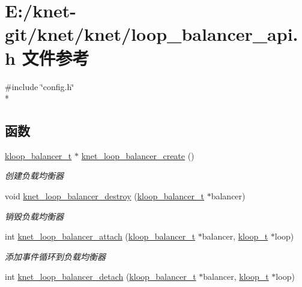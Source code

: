 \hypertarget{a00076}{}\section{E\+:/knet-\/git/knet/knet/loop\+\_\+balancer\+\_\+api.h 文件参考}
\label{a00076}
{\ttfamily \#include \char`\"{}config.\+h\char`\"{}}\\*
\subsection*{函数}
\begin{DoxyCompactItemize}
\item 
\hyperlink{a00053_abd3f964265beb2f8984e76f44fb5ea33_abd3f964265beb2f8984e76f44fb5ea33}{kloop\+\_\+balancer\+\_\+t} $\ast$ \hyperlink{a00109_ga4211b2d32e1a7447e479b9727dce61d4_ga4211b2d32e1a7447e479b9727dce61d4}{knet\+\_\+loop\+\_\+balancer\+\_\+create} ()
\begin{DoxyCompactList}\small\item\em 创建负载均衡器 \end{DoxyCompactList}\item 
void \hyperlink{a00109_ga6fcdd378027b0705cd2e279601985609_ga6fcdd378027b0705cd2e279601985609}{knet\+\_\+loop\+\_\+balancer\+\_\+destroy} (\hyperlink{a00053_abd3f964265beb2f8984e76f44fb5ea33_abd3f964265beb2f8984e76f44fb5ea33}{kloop\+\_\+balancer\+\_\+t} $\ast$balancer)
\begin{DoxyCompactList}\small\item\em 销毁负载均衡器 \end{DoxyCompactList}\item 
int \hyperlink{a00109_ga647f8a2d39c97c8759f8768ebc612b98_ga647f8a2d39c97c8759f8768ebc612b98}{knet\+\_\+loop\+\_\+balancer\+\_\+attach} (\hyperlink{a00053_abd3f964265beb2f8984e76f44fb5ea33_abd3f964265beb2f8984e76f44fb5ea33}{kloop\+\_\+balancer\+\_\+t} $\ast$balancer, \hyperlink{a00053_a97fc76209a58362019f1ded9169e397f_a97fc76209a58362019f1ded9169e397f}{kloop\+\_\+t} $\ast$loop)
\begin{DoxyCompactList}\small\item\em 添加事件循环到负载均衡器 \end{DoxyCompactList}\item 
int \hyperlink{a00109_ga705fd81a537d18cfe1b66df9d15b6c4e_ga705fd81a537d18cfe1b66df9d15b6c4e}{knet\+\_\+loop\+\_\+balancer\+\_\+detach} (\hyperlink{a00053_abd3f964265beb2f8984e76f44fb5ea33_abd3f964265beb2f8984e76f44fb5ea33}{kloop\+\_\+balancer\+\_\+t} $\ast$balancer, \hyperlink{a00053_a97fc76209a58362019f1ded9169e397f_a97fc76209a58362019f1ded9169e397f}{kloop\+\_\+t} $\ast$loop)

\end{DoxyCompactItemize}
